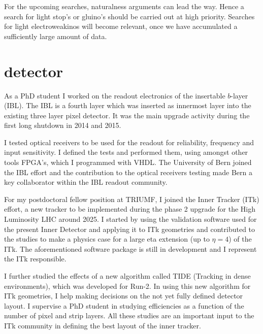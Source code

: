 \documentclass[]{cv} %
\begin{document}
\begin{statement}
For the upcoming searches, naturalness arguments can lead the way. Hence a
search for light stop's or gluino's should be carried out at high priority.
Searches for light electroweakinos will become relevant, once we have
accumulated a sufficiently large amount of data.

\section{detector}

As a PhD student I worked on the readout electronics of the insertable $b$-layer
(IBL). The IBL is a fourth layer which was inserted as innermost layer into the
existing three layer pixel detector. It was the main upgrade activity during the
first long shutdown in 2014 and 2015.

I tested optical receivers to be used for the readout for reliability, frequency
and input sensitivity. I defined the tests and performed them, using amongst
other tools FPGA's, which I programmed with VHDL. The University of Bern joined
the IBL effort and the contribution to the optical receivers testing made Bern a
key collaborator within the IBL readout community.

For my postdoctoral fellow position at TRIUMF, I joined the Inner Tracker (ITk)
effort, a new tracker to be implemented during the phase 2 upgrade for the High
Luminosity LHC around 2025. I started by using the validation software used for
the present Inner Detector and applying it to ITk geometries and contributed to
the studies to make a physics case for a large eta extension (up to $\eta = 4$)
of the ITk. The aforementioned software package is still in development and I
represent the ITk responsible.

I further studied the effects of a new algorithm called TIDE (Tracking in dense
environments), which was developed for Run-2. In using this new algorithm for
ITk geometries, I help making decisions on the not yet fully defined detector
layout. I supervise a PhD student in studying efficiencies as a function of the
number of pixel and strip layers. All these studies are an important input to
the ITk community in defining the best layout of the inner tracker.

\end{statement}
\end{document}
